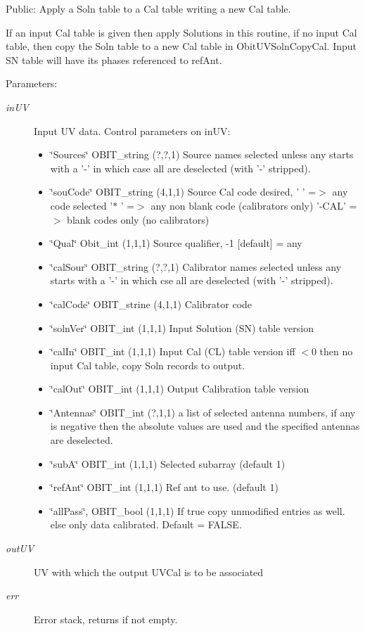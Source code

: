 Public: Apply a Soln table to a Cal table writing a new Cal table. 

If an input Cal table is given then apply Solutions in this routine, if no input Cal table, then copy the Soln table to a new Cal table in Obit\-UVSoln\-Copy\-Cal. Input SN table will have its phases referenced to ref\-Ant. \begin{Desc}
\item[Parameters:]
\begin{description}
\item[{\em in\-UV}]Input UV data. Control parameters on in\-UV: \begin{itemize}
\item \char`\"{}Sources\char`\"{} OBIT\_\-string (?,?,1) Source names selected unless any starts with a '-' in which case all are deselected (with '-' stripped). \item \char`\"{}sou\-Code\char`\"{} OBIT\_\-string (4,1,1) Source Cal code desired, ' ' =$>$ any code selected '$\ast$ ' =$>$ any non blank code (calibrators only) '-CAL' =$>$ blank codes only (no calibrators) \item \char`\"{}Qual\char`\"{} Obit\_\-int (1,1,1) Source qualifier, -1 [default] = any \item \char`\"{}cal\-Sour\char`\"{} OBIT\_\-string (?,?,1) Calibrator names selected unless any starts with a '-' in which cse all are deselected (with '-' stripped). \item \char`\"{}cal\-Code\char`\"{} OBIT\_\-strine (4,1,1) Calibrator code \item \char`\"{}soln\-Ver\char`\"{} OBIT\_\-int (1,1,1) Input Solution (SN) table version \item \char`\"{}cal\-In\char`\"{} OBIT\_\-int (1,1,1) Input Cal (CL) table version iff $<$0 then no input Cal table, copy Soln records to output. \item \char`\"{}cal\-Out\char`\"{} OBIT\_\-int (1,1,1) Output Calibration table version \item \char`\"{}Antennas\char`\"{} OBIT\_\-int (?,1,1) a list of selected antenna numbers, if any is negative then the absolute values are used and the specified antennas are deselected. \item \char`\"{}sub\-A\char`\"{} OBIT\_\-int (1,1,1) Selected subarray (default 1) \item \char`\"{}ref\-Ant\char`\"{} OBIT\_\-int (1,1,1) Ref ant to use. (default 1) \item \char`\"{}all\-Pass\char`\"{}, OBIT\_\-bool (1,1,1) If true copy unmodified entries as well. else only data calibrated. Default = FALSE. \end{itemize}
\item[{\em out\-UV}]UV with which the output UVCal is to be associated \item[{\em err}]Error stack, returns if not empty. \end{description}
\end{Desc}
